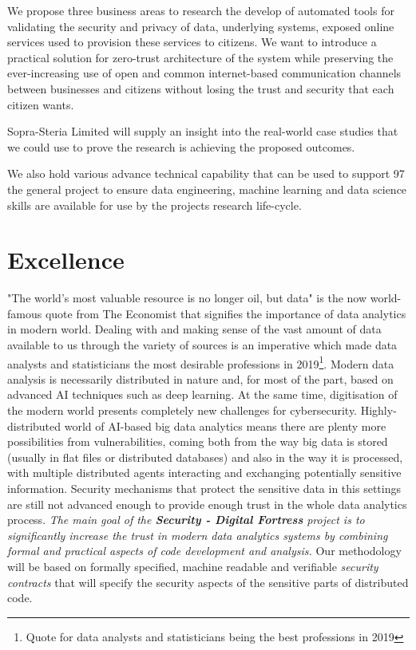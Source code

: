 \documentclass[a4paper,11pt]{article}
\newcommand{\project}[1]{\textbf{#1}\xspace}
\newcommand{\SECURITY}{\project{Security - Digital Fortress}}
\newcommand{\TheProject}{\SECURITY}
\begin{document}
We propose three business areas to research the develop of automated tools for validating the security and privacy of data, underlying systems, exposed online services used to provision these services to citizens. We want to introduce a practical solution for zero-trust architecture of the system while preserving the ever-increasing use of open and common internet-based communication channels between businesses and citizens without losing the trust and security that each citizen wants.

Sopra-Steria Limited will supply an insight into the real-world case studies that we could use to prove the research is achieving the proposed outcomes.

We also hold various advance technical capability that can be used to support 
97
 the general project to ensure data engineering, machine learning and data science skills are available for use by the projects research life-cycle.


\pagebreak
\section{Excellence}
"The world's most valuable resource is no longer oil, but data" is the now world-famous quote from The Economist that signifies the importance of data analytics in modern world. Dealing with and making sense of the vast amount of data available to us through the variety of sources is an imperative which made data analysts and statisticians the most desirable professions in 2019\footnote{Quote for data analysts and statisticians being the best professions in 2019}. Modern data analysis is necessarily distributed in nature and, for most of the part, based on advanced AI techniques such as deep learning. At the same time, digitisation of the modern world presents completely new challenges for cybersecurity. Highly-distributed world of AI-based big data analytics means there are plenty more possibilities from vulnerabilities, coming both from the way big data is stored (usually in flat files or distributed databases) and also in the way it is processed, with multiple distributed agents interacting and exchanging potentially sensitive information. Security mechanisms that protect the sensitive data in this settings are still not advanced enough to provide enough trust in the whole data analytics process. \emph{The main goal of the \TheProject{} project is to significantly increase the trust in modern data analytics systems by combining formal and practical aspects of code development and analysis.} Our methodology will be based on formally specified, machine readable and verifiable \emph{security contracts} that will specify the security aspects of the sensitive parts of distributed code.
\end{document}
